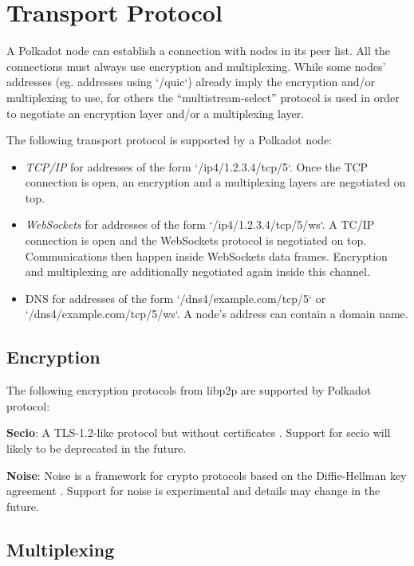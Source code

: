\documentclass{book}
\newcommand{\tmem}[1]{{\em #1\/}}
\newcommand{\tmstrong}[1]{\textbf{#1}}
\newcommand{\tmtextbf}[1]{{\bfseries{#1}}}
\newcommand{\tmtextit}[1]{{\itshape{#1}}}
\providecommand{\tmem}[1]{\tmtextit{#1}}
\providecommand{\tmstrong}[1]{\tmtextbf{#1}}
\providecommand{\tmtextbf}[1]{\tmtextbf{#1}}
\providecommand{\tmtextit}[1]{\tmtextit{#1}}
\begin{document}
\section{Transport Protocol}

A Polkadot node can establish a connection with nodes in its peer list. All
the connections must always use encryption and multiplexing. While some nodes'
addresses (eg. addresses using `/quic`) already imply the encryption and/or
multiplexing to use, for others the ``multistream-select'' protocol is used in
order to negotiate an encryption layer and/or a multiplexing layer.

The following transport protocol is supported by a Polkadot node:
\begin{itemize}
  \item {\tmem{TCP/IP}} for addresses of the form `/ip4/1.2.3.4/tcp/5`. Once
  the TCP connection is open, an encryption and a multiplexing layers are
  negotiated on top.
  
  \item {\tmem{WebSockets}} for addresses of the form `/ip4/1.2.3.4/tcp/5/ws`.
  A TC/IP connection is open and the WebSockets protocol is negotiated on top.
  Communications then happen inside WebSockets data frames. Encryption and
  multiplexing are additionally negotiated again inside this channel.
  
  \item DNS for addresses of the form `/dns4/example.com/tcp/5` or
  `/dns4/example.com/tcp/5/ws`. A node's address can contain a domain name.
\end{itemize}

\subsection{Encryption}

The following encryption protocols from libp2p are supported by Polkadot
protocol:

\item {\tmstrong{Secio}}: A TLS-1.2-like protocol but without certificates
{\cite{protocol_labs_libp2p_2019}}. Support for secio will likely to be
deprecated in the future.

\item {\tmstrong{Noise}}: Noise is a framework for crypto protocols based on
the Diffie-Hellman key agreement {\cite{perrin_noise_2018}}. Support for noise
is experimental and details may change in the future.

\subsection{Multiplexing}
\end{document}
